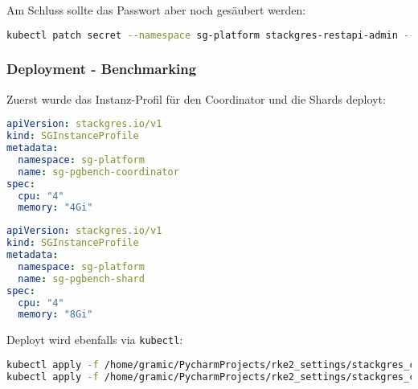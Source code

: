 Am Schluss sollte das Passwort aber noch gesäubert werden:
\lstset{style=gra_codestyle}
\begin{lstlisting}[language=bash, caption=StackGres-Citus - System Passwort Cleanup,captionpos=b,label={lst:stackgres_citus-system-password-cleanup},breaklines=true]
kubectl patch secret --namespace sg-platform stackgres-restapi-admin --type json -p '[{"op":"remove","path":"/data/clearPassword"}]'
\end{lstlisting}

\subsubsection{Deployment - Benchmarking}
Zuerst wurde das Instanz-Profil für den Coordinator und die Shards deployt:
\lstset{style=gra_codestyle}
\begin{lstlisting}[language=yaml, caption=StackGres-Citus - Benchmarking - SGInstanceProfile Coordinator,captionpos=b,label={lst:SGInstanceProfile_pgbench_coord.yaml},breaklines=true]
apiVersion: stackgres.io/v1
kind: SGInstanceProfile
metadata:
  namespace: sg-platform
  name: sg-pgbench-coordinator
spec:
  cpu: "4"
  memory: "4Gi"
\end{lstlisting}
\lstset{style=gra_codestyle}
\begin{lstlisting}[language=yaml, caption=StackGres-Citus - Benchmarking - SGInstanceProfile Shard,captionpos=b,label={lst:SGInstanceProfile_pgbench_shard.yaml},breaklines=true]
apiVersion: stackgres.io/v1
kind: SGInstanceProfile
metadata:
  namespace: sg-platform
  name: sg-pgbench-shard
spec:
  cpu: "4"
  memory: "8Gi"
\end{lstlisting}

Deployt wird ebenfalls via \texttt{kubectl}:
\lstset{style=gra_codestyle}
\begin{lstlisting}[language=bash, caption=StackGres-Citus - Benchmarking - Instanz-Profil Deploy,captionpos=b,label={lst:stackgres_citus-deploy-benchmarking-instance-profiles},breaklines=true]
kubectl apply -f /home/gramic/PycharmProjects/rke2_settings/stackgres_citus/stackgres_citus/SGInstanceProfile_pgbench_coord.yaml
kubectl apply -f /home/gramic/PycharmProjects/rke2_settings/stackgres_citus/stackgres_citus/SGInstanceProfile_pgbench_shard.yaml
\end{lstlisting}

